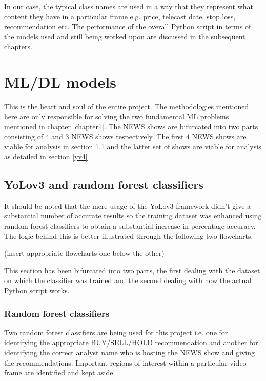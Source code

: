 In our case, the typical class names are used in a way that they represent what content they have in a particular frame e.g. price, telecast date, stop loss, recommendation etc. The performance of the overall Python script in terms of the models used and still being worked upon are discussed in the subsequent chapters.

\section{ML/DL models}

This is the heart and soul of the entire project. The methodologies mentioned here are only responsible for solving the two fundamental ML problems mentioned in chapter \ref{chapter1}. The NEWS shows are bifurcated into two parts consisting of $4$ and $3$ NEWS shows respectively. The first $4$ NEWS shows are viable for analysis in section \ref{yv3} and the latter set of shows are viable for analysis as detailed in section \ref{yv4}

\subsection{YoLov3 and random forest classifiers} \label{yv3}

It should be noted that the mere usage of the YoLov3 framework didn’t give a substantial number of accurate results so the training dataset was enhanced using random forest classifiers to obtain a substantial increase in percentage accuracy. The logic behind this is better illustrated through the following two flowcharts.

(insert appropriate flowcharts one below the other)

This section has been bifurcated into two parts, the first dealing with the dataset on which the classifier was trained and the second dealing with how the actual Python script works.

\subsubsection{Random forest classifiers}
Two random forest classifiers are being used for this project i.e. one for identifying the appropriate BUY/SELL/HOLD recommendation and another for identifying the correct analyst name who is hosting the NEWS show and giving the recommendations. Important regions of interest within a particular video frame are identified and kept aside. \par

